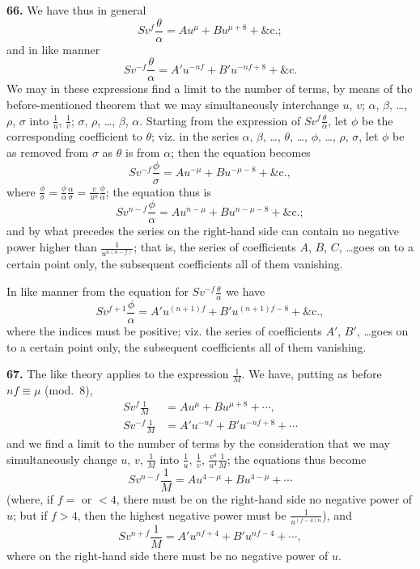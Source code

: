\documentclass[11pt,a4paper]{book}
\begin{document}
\textbf{66.} We have thus in general
\[
Sv^{\!f}\frac{\theta}{\alpha} = Au^{\mu} + Bu^{\mu+8} + \&\text{c.};
\]
and in like manner
\[
Sv^{-\!f}\frac{\theta}{\alpha} = A'u^{-\!nf} + B'u^{-\!nf+8} + \&\text{c.}
\]
We may in these expressions find a limit to the number of terms, by means of the before-mentioned theorem that we may simultaneously interchange $u$, $v$; $\alpha$, $\beta$, \ldots, $\rho$, $\sigma$ into $\frac{1}{u}$, $\frac{1}{v}$; $\sigma$, $\rho$, \ldots, $\beta$, $\alpha$. Starting from the expression of $Sv^{\!f}\frac{\theta}{\alpha}$, let $\phi$ be the corresponding coefficient to $\theta$; viz. in the series $\alpha$, $\beta$, \ldots, $\theta$, \ldots, $\phi$, \ldots, $\rho$, $\sigma$, let $\phi$ be as removed from $\sigma$ as $\theta$ is from $\alpha$; then the equation becomes
\[
Sv^{-\!f}\frac{\phi}{\sigma} = Au^{-\!\mu} + Bu^{-\!\mu-8} + \&\text{c.},
\]
where $\frac{\phi}{\sigma} = \frac{\phi}{\alpha} \frac{\alpha}{\sigma} = \frac{v}{u^n}\frac{\phi}{\alpha}$; the equation thus is
\[
Sv^{\!n-f}\frac{\phi}{\alpha} = Au^{n-\mu} + Bu^{n-\mu-8} + \&\text{c.};
\]
and by what precedes the series on the right-hand side can contain no negative power higher than $\frac{1}{u^{n(n-f)}}$; that is, the series of coefficients $A$, $B$, $C$, \ldots goes on to a certain point only, the subsequent coefficients all of them vanishing.

In like manner from the equation for $Sv^{-\!f}\frac{\theta}{\alpha}$ we have
\[
Sv^{\!f+1}\frac{\phi}{\alpha} = A'u^{(n+1)f} + B'u^{(n+1)f-8} + \&\text{c.},
\]
where the indices must be positive; viz. the series of coefficients $A'$, $B'$, \ldots goes on to a certain point only, the subsequent coefficients all of them vanishing.

\textbf{67.} The like theory applies to the expression $\frac{1}{M}$. We have, putting as before $nf \equiv \mu$ (mod.~8),
\begin{align*}
Sv^{\!f}\frac{1}{M} &= Au^{\mu} + Bu^{\mu+8} + \cdots, \\
Sv^{-\!f}\frac{1}{M} &= A'u^{-\!nf} + B'u^{-\!nf+8} + \cdots
\end{align*}
and we find a limit to the number of terms by the consideration that we may simultaneously change $u$, $v$, $\frac{1}{M}$ into $\frac{1}{u}$, $\frac{1}{v}$, $\frac{v^4}{u^4}\frac{1}{M}$; the equations thus become
\[
Sv^{\!n-f}\frac{1}{M} = Au^{4-\mu} + Bu^{4-\mu} + \cdots
\]
(where, if $f =$ or $< 4$, there must be on the right-hand side no negative power of $u$; but if $f > 4$, then the highest negative power must be $\frac{1}{u^{(f-4)n}}$), and
\[
Sv^{\!n+f}\frac{1}{M} = A'u^{\!nf+4} + B'u^{\!nf-4} + \cdots,
\]
where on the right-hand side there must be no negative power of $u$.
\end{document}
